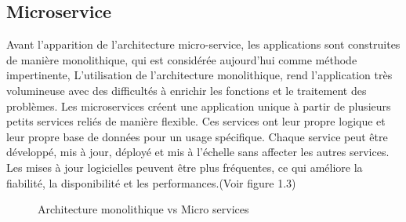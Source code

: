 \subsection{\LARGE  Microservice}
\textsf{\selectfont{} Avant l'apparition de l'architecture micro-service, les applications sont construites de
    manière monolithique, qui est considérée aujourd’hui comme méthode impertinente, L’utilisation de l'architecture monolithique, rend l’application très
    volumineuse avec des difficultés à enrichir les fonctions et le traitement des problèmes.
    Les microservices créent une application unique à partir de plusieurs petits services reliés de manière flexible.
    Ces services ont leur propre logique et leur propre base de données pour un usage spécifique. Chaque service peut être développé, mis à jour, déployé et mis à l’échelle sans affecter les autres services. Les mises à jour logicielles peuvent être plus fréquentes, ce qui améliore la fiabilité, la disponibilité et les performances.(Voir figure 1.3)
}
\begin{figure}[H]
    \begin{center}
    \end{center}
    \caption{Architecture monolithique vs Micro services}
\end{figure}
